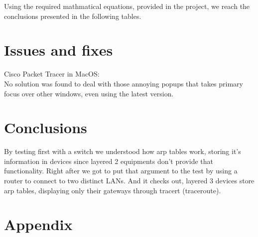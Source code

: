 \documentclass[11pt,a4paper]{report}
\begin{document}
    Using the required mathmatical equations, provided in the project, we reach the conclusions presented in the following tables.\\


\chapter{Issues and fixes}
    Cisco Packet Tracer in MacOS:\\
        \hspace*{10mm}No solution was found to deal with those annoying popups that takes primary focus over other windows, even using the latest version.

\chapter{Conclusions}
    By testing first with a switch we understood how arp tables work, storing it's information in devices since layered 2 equipments don't provide that functionality. Right after we got to put that argument to the test by using a router to connect to two distinct LANs. And it checks out, layered 3 devices store arp tables, displaying only their gateways through tracert (traceroute).

%
%

\appendix
\chapter{Appendix}
\end{document}
